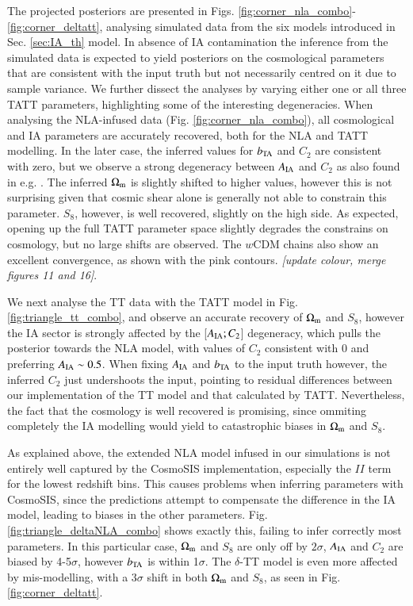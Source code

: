  The projected posteriors  are presented in Figs. \ref{fig:corner_nla_combo}-\ref{fig:corner_deltatt}, analysing simulated data from the six models introduced in Sec. \ref{sec:IA_th} model. In absence of IA contamination the inference from the simulated data is expected to yield posteriors on the cosmological parameters that are consistent with the input truth but not necessarily centred on it due to sample variance. We further dissect the analyses by varying either  one or  all three TATT parameters, highlighting some of the interesting degeneracies.   When analysing the NLA-infused data (Fig. \ref{fig:corner_nla_combo}), all cosmological and IA  parameters are accurately recovered, both for the NLA and TATT modelling. In the later case, the inferred values for $b_{\rm TA}$ and $C_2$ are consistent with zero, but we observe a strong degeneracy between  $A_{\rm IA}$ and  $C_2$ as also found in e.g. \citet[][\it  cite other papers?]{Paopiamsap2024}. 
The inferred  $\Omega_{\rm m}$ is slightly shifted to higher values, however this is not surprising given that cosmic shear alone is generally not able to constrain this parameter. $S_8$, however,  is well recovered, slightly on the high side. As expected, opening up the full TATT parameter space slightly degrades the constrains on cosmology, but no large shifts are observed. The $w$CDM chains also show an excellent convergence, as shown with the pink contours. {\it [update colour, merge figures 11 and 16]}.
 

 We next analyse the TT data with the TATT model in Fig. \ref{fig:triangle_tt_combo}, and  observe an accurate recovery of  $\Omega_{\rm m}$ and $S_8$, however the IA sector is strongly affected by the [$A_{\rm IA}; C_2$] degeneracy, which  pulls the posterior towards the NLA model, with values of $C_2$ consistent with 0 and preferring $A_{\rm IA}\sim 0.5$. When fixing $A_{\rm IA}$ and $b_{\rm TA}$ to the input truth however, the inferred $C_2$ just undershoots the input, pointing to residual differences between our implementation of the TT model and that calculated by TATT. Nevertheless, the fact that the cosmology is well recovered is promising, since ommiting completely the IA modelling would yield to catastrophic biases in $\Omega_{\rm m}$ and $S_8$. 


 As explained above, the extended NLA model infused in our simulations is not entirely well captured by the {\sc CosmoSIS} implementation, especially the $II$ term for the lowest redshift bins. This causes problems when inferring parameters with  {\sc CosmoSIS}, since the predictions attempt to compensate the difference in the IA model, leading to biases in the other parameters. Fig. \ref{fig:triangle_deltaNLA_combo} shows exactly this, failing to infer correctly most parameters. In this particular case,  $\Omega_{\rm m}$ and $S_8$ are only off by $2\sigma$, $A_{\rm IA}$ and $C_2$ are biased by 4-5$\sigma$, however $b_{\rm TA}$ is within 1$\sigma$. The $\delta$-TT model is even more affected by mis-modelling, with a 3$\sigma$ shift in both $\Omega_{\rm m}$ and $S_8$, as seen in Fig. \ref{fig:corner_deltatt}.
 
